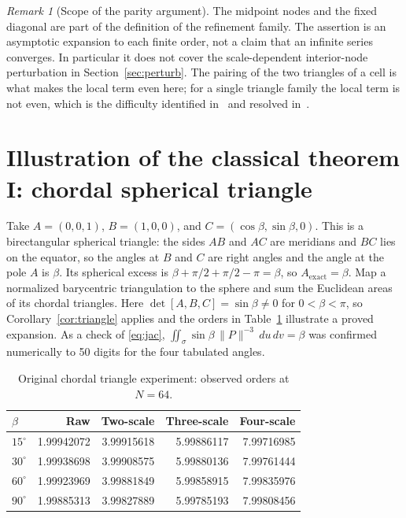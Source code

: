 \documentclass[11pt]{article}
\theoremstyle{remark}
\newtheorem{remark}{Remark}
\newcommand{\Aex}{A_{\mathrm{exact}}}
\begin{document}
\begin{remark}[Scope of the parity argument]
The midpoint nodes and the fixed diagonal are part of the definition of the
refinement family. The assertion is an asymptotic expansion to each finite
order, not a claim that an infinite series converges. In particular it does
not cover the scale-dependent interior-node perturbation in Section~\ref{sec:perturb}. The
pairing of the two triangles of a cell is what makes the local term even here; for a single
triangle family the local term is not even, which is the difficulty identified
in~\cite{georgtausch} and resolved in~\cite{verlindencools,lyness94}.
\end{remark}

\section{Illustration of the classical theorem I: chordal spherical triangle}\label{sec:triangle}
Take $A=(0,0,1)$, $B=(1,0,0)$, and $C=(\cos\beta,\sin\beta,0)$. This is a birectangular
spherical triangle: the sides $AB$ and $AC$ are meridians and $BC$ lies on the equator, so the
angles at $B$ and $C$ are right angles and the angle at the pole $A$ is $\beta$. Its spherical
excess is $\beta+\pi/2+\pi/2-\pi=\beta$, so $\Aex=\beta$. Map a normalized barycentric
triangulation to the sphere and sum the Euclidean areas of its chordal triangles. Here
$\det[A,B,C]=\sin\beta\neq0$ for $0<\beta<\pi$, so Corollary~\ref{cor:triangle} applies and the
orders in Table~\ref{tab:triangle} illustrate a proved expansion. As a check of
\eqref{eq:jac}, $\iint_\sigma\sin\beta\,\|P\|^{-3}\,du\,dv=\beta$ was confirmed numerically to
50 digits for the four tabulated angles.

\begin{table}[ht]
\centering
\begin{tabular}{lrrrr}
\toprule
$\beta$ & Raw & Two-scale & Three-scale & Four-scale\\
\midrule
$15^\circ$ & 1.99942072 & 3.99915618 & 5.99886117 & 7.99716985\\
$30^\circ$ & 1.99938698 & 3.99908575 & 5.99880136 & 7.99761444\\
$60^\circ$ & 1.99923969 & 3.99881849 & 5.99858915 & 7.99835976\\
$90^\circ$ & 1.99885313 & 3.99827889 & 5.99785193 & 7.99808456\\
\bottomrule
\end{tabular}
\caption{Original chordal triangle experiment: observed orders at $N=64$.}\label{tab:triangle}
\end{table}
\end{document}
